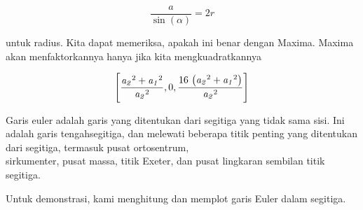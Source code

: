 \documentclass[12pt,arial,letterpaper]{book}
\begin{document}
\begin{eulernootebook}
\begin{eulercomment}
\begin{eulercomment}
\begin{eulernootebook}
\begin{eulercomment}
\begin{eulercomment}
\begin{eulercomment}
\begin{eulercomment}
\begin{eulercomment}
\begin{eulercomment}
\begin{eulernotebook}
\begin{eulercomment}
\begin{eulercomment}
\begin{eulercomment}
\end{eulercomment}
\begin{eulerformula}
\[
\frac{a}{\sin(\alpha)}=2r
\]
\end{eulerformula}
\begin{eulercomment}
untuk radius. Kita dapat memeriksa, apakah ini benar dengan Maxima.
Maxima akan menfaktorkannya hanya jika kita mengkuadratkannya
\end{eulercomment}
\begin{eulerformula}
\[
\left[ \frac{{\it a_2}^2+{\it a_1}^2}{{\it a_2}^2} , 0 , \frac{16\,
 \left({\it a_2}^2+{\it a_1}^2\right)}{{\it a_2}^2} \right] 
\]
\end{eulerformula}
\begin{eulercomment}
Garis euler adalah garis yang ditentukan dari segitiga yang tidak sama
sisi. Ini adalah garis tengahsegitiga, dan melewati beberapa titik
penting yang ditentukan dari segitiga, termasuk pusat ortosentrum,\\
sirkumenter, pusat massa, titik Exeter, dan pusat lingkaran sembilan
titik segitiga.

Untuk demonstrasi, kami menghitung dan memplot garis Euler dalam
segitiga.


\end{eulercomment}
\end{eulercomment}
\end{eulercomment}
\end{eulernotebook}
\end{eulercomment}
\end{eulercomment}
\end{eulercomment}
\end{eulercomment}
\end{eulercomment}
\end{eulercomment}
\end{eulernootebook}
\end{eulercomment}
\end{eulercomment}
\end{eulernootebook}
\end{document}
